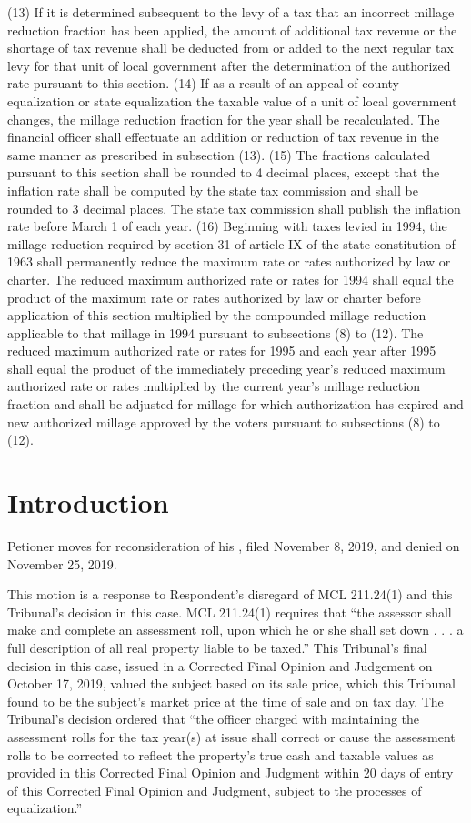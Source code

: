 \documentclass[12pt,\documentclassflag]{michiganCourtOfAppealsBrief}
\begin{document}
  (13) If it is determined subsequent to the levy of a tax that an incorrect millage reduction fraction has been applied, the amount of additional tax revenue or the shortage of tax revenue shall be deducted from or added to the next regular tax levy for that unit of local government after the determination of the authorized rate pursuant to this section.
  (14) If as a result of an appeal of county equalization or state equalization the taxable value of a unit of local government changes, the millage reduction fraction for the year shall be recalculated. The financial officer shall effectuate an addition or reduction of tax revenue in the same manner as prescribed in subsection (13).
  (15) The fractions calculated pursuant to this section shall be rounded to 4 decimal places, except that the inflation rate shall be computed by the state tax commission and shall be rounded to 3 decimal places. The state tax commission shall publish the inflation rate before March 1 of each year.
  (16) Beginning with taxes levied in 1994, the millage reduction required by section 31 of article IX of the state constitution of 1963 shall permanently reduce the maximum rate or rates authorized by law or charter. The reduced maximum authorized rate or rates for 1994 shall equal the product of the maximum rate or rates authorized by law or charter before application of this section multiplied by the compounded millage reduction applicable to that millage in 1994 pursuant to subsections (8) to (12). The reduced maximum authorized rate or rates for 1995 and each year after 1995 shall equal the product of the immediately preceding year's reduced maximum authorized rate or rates multiplied by the current year's millage reduction fraction and shall be adjusted for millage for which authorization has expired and new authorized millage approved by the voters pursuant to subsections (8) to (12).

  

\section{Introduction}

Petioner moves for reconsideration of his \cite{Motion to correct record card}, filed November 8, 2019, and denied on November 25, 2019. 

This motion is a response to Respondent's disregard of MCL 211.24(1) and this Tribunal's decision in this case. MCL 211.24(1) requires that ``the assessor shall make and complete an assessment roll, upon which he or she shall set down . . . a full description of all real property liable to be taxed.'' This Tribunal's final decision in this case, issued in a Corrected Final Opinion and Judgement on October 17, 2019, valued the subject based on its sale price, which this Tribunal found to be the subject's market price at the time of sale and on tax day. The Tribunal's  decision ordered that ``the officer charged with maintaining the assessment
rolls for the tax year(s) at issue shall correct or cause the assessment rolls to be
corrected to reflect the property's true cash and taxable values as provided in this
Corrected Final Opinion and Judgment within 20 days of entry of this Corrected Final
Opinion and Judgment, subject to the processes of equalization.''
\end{document}
